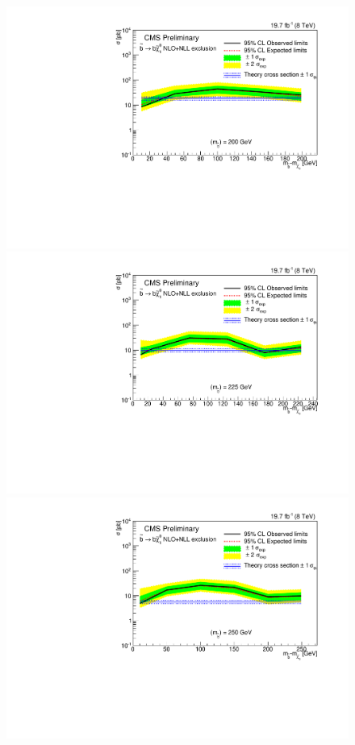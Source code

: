 \begin{figure}[!Hhtb]
\begin{center}
  \includegraphics[scale=0.39]{Figures/sus13009/limitplots/plots/sbottom/Limit_DM_sbottom_200.pdf}
  \includegraphics[scale=0.39]{Figures/sus13009/limitplots/plots/sbottom/Limit_DM_sbottom_225.pdf}
  \includegraphics[scale=0.39]{Figures/sus13009/limitplots/plots/sbottom/Limit_DM_sbottom_250.pdf}

\end{center}
\end{figure}
